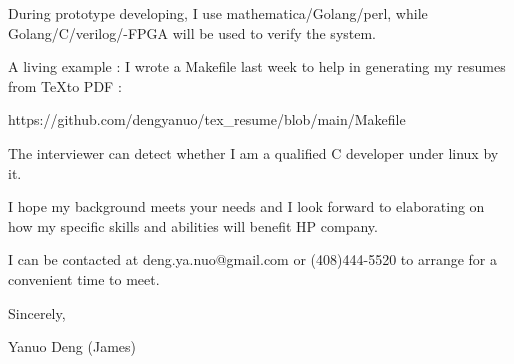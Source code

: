 { \bigbreak } 
During prototype developing, I use mathematica/Golang/perl, 
while Golang/C/verilog/-FPGA will be used to verify the system.

{ \bigbreak } 
A living example : I wrote a Makefile last week to help in generating my resumes from \TeX to PDF : 

\centerline{
https://github.com/dengyanuo/tex\_resume/blob/main/Makefile
}

The interviewer can detect whether I am a qualified C developer under linux by it.

{ \bigbreak } 
I hope my background meets your needs and I look
forward to elaborating on how my specific skills and abilities will benefit HP company.

{ \bigbreak } 
I can be contacted at deng.ya.nuo@gmail.com
or (408)444-5520 to arrange for a convenient time to meet.

{ \bigbreak } 




\vskip 60pt

{ \bigbreak } 
Sincerely,

Yanuo Deng (James)

\bye
